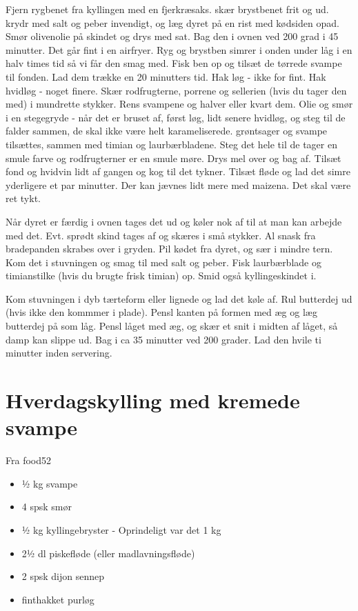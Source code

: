 \documentclass[
]{book}
\providecommand{\tightlist}{%
  \setlength{\itemsep}{0pt}\setlength{\parskip}{0pt}}
\begin{document}
Fjern rygbenet fra kyllingen med en fjerkræsaks. skær brystbenet frit og ud.
krydr med salt og peber invendigt, og læg dyret på en rist med kødsiden opad.
Smør olivenolie på skindet og drys med sat. Bag den i ovnen ved 200 grad i
45 minutter. Det går fint i en airfryer.
Ryg og brystben simrer i onden under låg i en halv times tid så vi får den
smag med. Fisk ben op og tilsæt de tørrede svampe til fonden. Lad dem trække
en 20 minutters tid.
Hak løg - ikke for fint. Hak hvidløg - noget finere. Skær rodfrugterne, porrene
og sellerien (hvis du tager den med) i mundrette stykker. Rens svampene og
halver eller kvart dem.
Olie og smør i en stegegryde - når det er bruset af, først løg, lidt senere
hvidløg, og steg til de falder sammen, de skal ikke være helt karameliserede.
grøntsager og svampe tilsættes, sammen med timian og laurbærbladene. Steg det hele
til de tager en smule farve og rodfrugterner er en smule møre. Drys mel over
og bag af. Tilsæt fond og hvidvin lidt af gangen og kog til det tykner.
Tilsæt fløde og lad det simre yderligere et par minutter. Der kan jævnes lidt
mere med maizena. Det skal være ret tykt.

Når dyret er færdig i ovnen tages det ud og køler nok af til at man kan arbejde
med det. Evt. sprødt skind tages af og skæres i små stykker.
Al snask fra bradepanden skrabes over i gryden.
Pil kødet fra dyret, og sær i mindre tern. Kom det i stuvningen og smag til med
salt og peber. Fisk laurbærblade og timianstilke (hvis du brugte frisk timian)
op. Smid også kyllingeskindet i.

Kom stuvningen i dyb tærteform eller lignede og lad det køle af.
Rul butterdej ud (hvis ikke den kommmer i plade). Pensl kanten på formen med æg
og læg butterdej på som låg. Pensl låget med æg, og skær et snit i midten af
låget, så damp kan slippe ud. Bag i ca 35 minutter ved 200 grader. Lad
den hvile ti minutter inden servering.

\hypertarget{hverdagskylling-med-kremede-svampe}{%
\section{Hverdagskylling med kremede svampe}\label{hverdagskylling-med-kremede-svampe}}

Fra food52

\begin{itemize}
\tightlist
\item
  ½ kg svampe
\item
  4 spsk smør
\item
  ½ kg kyllingebryster - Oprindeligt var det 1 kg
\item
  2½ dl piskefløde (eller madlavningsfløde)
\item
  2 spsk dijon sennep
\item
  finthakket purløg
\end{itemize}
\end{document}
